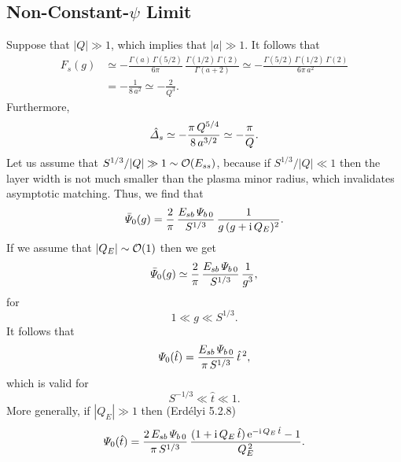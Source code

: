 \documentclass[titlepage=false,12pt]{article}
\begin{document}
\subsection{Non-Constant-$\psi$ Limit}
Suppose that $|Q|\gg 1$, which implies that $|a|\gg 1$.  It follows that
\begin{align}
F_s(g) &\simeq - \frac{\Gamma(a)\,\Gamma(5/2)}{6\pi}\,\frac{\Gamma(1/2)\,\Gamma(2)}{\Gamma(a+2)}\simeq-\frac{\Gamma(5/2)\,\Gamma(1/2)\,\Gamma(2)}{6\pi\,a^2}\nonumber\\[0.5ex]
&= -\frac{1}{8\,a^2}\simeq -\frac{2}{Q^{3}}.
\end{align}
Furthermore,
\begin{equation}
\hat{\mit\Delta}_s\simeq -\frac{\pi\,Q^{5/4}}{8\,a^{3/2}}\simeq-\frac{\pi}{Q}.
\end{equation}
Let us assume that $S^{1/3}/|Q|\gg 1\sim{\cal O}( E_{ss})$, because if $S^{1/3}/|Q|\ll 1$ then the layer width is not much smaller
than the plasma minor radius, which invalidates asymptotic matching. 
Thus, we find that
\begin{equation}
\bar{\mit\Psi}_0(g) = \frac{2}{\pi}\,\frac{E_{sb}\,{\mit\Psi}_{b\,0}}{S^{1/3}}\,\frac{1}{g\,(g+{\rm i}\,Q_E)^2}.
\end{equation}
If we assume that $|Q_E|\sim{\cal O}(1)$ then 
we get
\begin{equation}
\bar{\mit\Psi}_0(g) \simeq \frac{2}{\pi}\,\frac{E_{sb}\,{\mit\Psi}_{b\,0}}{S^{1/3}}\,\frac{1}{g^3},
\end{equation}
for
\begin{equation}
1\ll g\ll S^{1/3}.
\end{equation}
It follows that
\begin{equation}
{\mit\Psi}_0(\hat{t}) = \frac{E_{sb}\,{\mit\Psi}_{b\,0}}{\pi\,S^{1/3}} \,\hat{t}^{\,2},
\end{equation}
which is valid for
\begin{equation}
S^{-1/3} \ll \hat{t}\ll 1.
\end{equation}
More generally, if $|Q_E|\gg 1$ then (Erd\'{e}lyi 5.2.8)
\begin{equation}
{\mit\Psi}_0(\hat{t}) = \frac{2\,E_{sb}\,{\mit\Psi}_{b\,0}}{\pi\,S^{1/3}} \,\frac{(1+{\rm i}\,Q_E\,\hat{t})\,{\rm e}^{-{\rm i}\,Q_E\,\hat{t}}-1}{Q_E^{\,2}}.
\end{equation}
\end{document}
